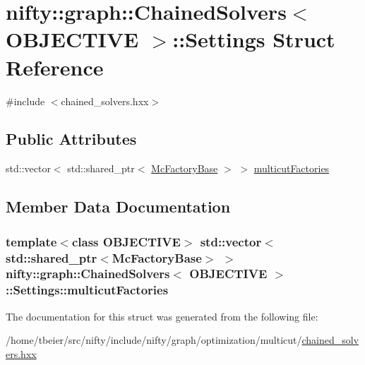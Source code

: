 \hypertarget{structnifty_1_1graph_1_1ChainedSolvers_1_1Settings}{}\section{nifty\+:\+:graph\+:\+:Chained\+Solvers$<$ O\+B\+J\+E\+C\+T\+I\+V\+E $>$\+:\+:Settings Struct Reference}
\label{structnifty_1_1graph_1_1ChainedSolvers_1_1Settings}


{\ttfamily \#include $<$chained\+\_\+solvers.\+hxx$>$}

\subsection*{Public Attributes}
\begin{DoxyCompactItemize}
\item 
std\+::vector$<$ std\+::shared\+\_\+ptr$<$ \hyperlink{classnifty_1_1graph_1_1ChainedSolvers_a8a106a334a73a0dd278d06af04ef163d}{Mc\+Factory\+Base} $>$ $>$ \hyperlink{structnifty_1_1graph_1_1ChainedSolvers_1_1Settings_abfe8993318d67d669c8f4d9d338cbf0e}{multicut\+Factories}
\end{DoxyCompactItemize}


\subsection{Member Data Documentation}
\hypertarget{structnifty_1_1graph_1_1ChainedSolvers_1_1Settings_abfe8993318d67d669c8f4d9d338cbf0e}{}
\subsubsection[{multicut\+Factories}]{\setlength{\rightskip}{0pt plus 5cm}template$<$class O\+B\+J\+E\+C\+T\+I\+V\+E$>$ std\+::vector$<$ std\+::shared\+\_\+ptr$<${\bf Mc\+Factory\+Base}$>$ $>$ {\bf nifty\+::graph\+::\+Chained\+Solvers}$<$ O\+B\+J\+E\+C\+T\+I\+V\+E $>$\+::Settings\+::multicut\+Factories}\label{structnifty_1_1graph_1_1ChainedSolvers_1_1Settings_abfe8993318d67d669c8f4d9d338cbf0e}


The documentation for this struct was generated from the following file\+:\begin{DoxyCompactItemize}
\item 
/home/tbeier/src/nifty/include/nifty/graph/optimization/multicut/\hyperlink{chained__solvers_8hxx}{chained\+\_\+solvers.\+hxx}\end{DoxyCompactItemize}
